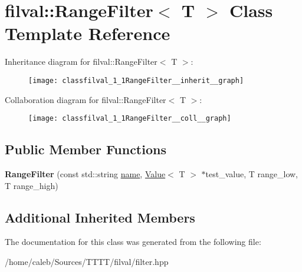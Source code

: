 \hypertarget{classfilval_1_1RangeFilter}{}\section{filval\+:\+:Range\+Filter$<$ T $>$ Class Template Reference}
\label{classfilval_1_1RangeFilter}


Inheritance diagram for filval\+:\+:Range\+Filter$<$ T $>$\+:
\nopagebreak
\begin{figure}[H]
\begin{center}
\leavevmode
\texttt{[image: classfilval\_1\_1RangeFilter\_\_inherit\_\_graph]}
\end{center}
\end{figure}


Collaboration diagram for filval\+:\+:Range\+Filter$<$ T $>$\+:
\nopagebreak
\begin{figure}[H]
\begin{center}
\leavevmode
\texttt{[image: classfilval\_1\_1RangeFilter\_\_coll\_\_graph]}
\end{center}
\end{figure}
\subsection*{Public Member Functions}
\begin{DoxyCompactItemize}
\item 
\hypertarget{classfilval_1_1RangeFilter_aca5c9585563a5edd970cf7bab9ee4ddb}{}\label{classfilval_1_1RangeFilter_aca5c9585563a5edd970cf7bab9ee4ddb} 
{\bfseries Range\+Filter} (const std\+::string \hyperlink{classfilval_1_1GenValue_a007e38c03ee041c2a657afa3d6e91ab1}{name}, \hyperlink{classfilval_1_1Value}{Value}$<$ T $>$ $\ast$test\+\_\+value, T range\+\_\+low, T range\+\_\+high)
\end{DoxyCompactItemize}
\subsection*{Additional Inherited Members}


The documentation for this class was generated from the following file\+:\begin{DoxyCompactItemize}
\item 
/home/caleb/\+Sources/\+T\+T\+T\+T/filval/filter.\+hpp\end{DoxyCompactItemize}
